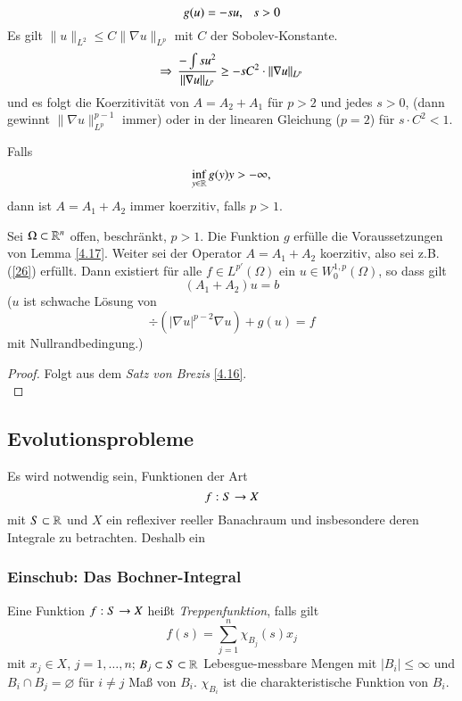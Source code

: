 \begin{beispiel}
\[
    g(u)=-su, \hspace{.25cm} s>0
\]
Es gilt $\|u\|_{L^2}\leq C\| \nabla u\|_{L^p}$ mit $C$ der Sobolev-Konstante.
\[
    \Rightarrow \, \frac{-\int su^2}{\|\nabla u\|_{L^p}} \geq -s C^2 \cdot\|\nabla u\|_{L^p}
\]
und es folgt die Koerzitivität von $A=A_2+A_1$ für $p>2$ und jedes $s>0$, (dann gewinnt $\|\nabla u \|
_{L^p}^{p-1}$ immer) oder in der linearen Gleichung ($p=2$) für $s\cdot C^2<1$.
\end{beispiel}

\begin{beispiel}
Falls
\begin{align}\label{26}
    \inf_{y\in \mathbb{R}} g(y) y> -\infty,
\end{align}
dann ist $A=A_1+A_2$ immer koerzitiv, falls $p>1$.
\end{beispiel}

\begin{theorem}\label{4.18}
    Sei $\Omega \subset\mathbb{R}^n$ offen, beschränkt, $p>1$. Die Funktion $g$ erfülle die Voraussetzungen von
    Lemma \ref{4.17}. Weiter sei der Operator $A=A_1+A_2$ koerzitiv, also sei z.B. (\ref{26}) erfüllt.
    Dann existiert für alle $f\in L^{p'}(\Omega)$ ein $u\in W_0^{1,p}(\Omega)$, so dass gilt
    \[
        (A_1+A_2)u=b
    \]
    ($u$ ist schwache Lösung von 
     \[
        \div(|\nabla u|^{p-2}\nabla u)+ g(u)=f
     \]
     mit Nullrandbedingung.)
\end{theorem}

\begin{proof}
    Folgt aus dem \textit{Satz von Brezis} \ref{4.16}. \[ \]
\end{proof}

\subsection{Evolutionsprobleme}

Es wird notwendig sein, Funktionen der Art
\[
    f:S\rightarrow X
\]
mit $S\subset \mathbb{R}$ und $X$ ein reflexiver reeller Banachraum und insbesondere deren Integrale zu
betrachten. Deshalb ein 

\subsubsection*{Einschub: Das Bochner-Integral}

\begin{defi}[Treppenfunktion]\label{4.19}
    Eine Funktion $f:S\rightarrow X$ heißt \textit{Treppenfunktion}, falls gilt
    \[
        f(s)=\sum_{j=1}^n \chi_{B_j} (s) x_j
    \]
    mit $x_j\in X$, $j=1,…,n$; $B_j\subset S \subset \mathbb{R}$ Lebesgue-messbare Mengen mit
    $|B_i|\leq \infty$ und $B_i\cap B_j=\varnothing$ für $i\neq j$ Maß von $B_i$. $\chi_{B_i}$ ist
    die charakteristische Funktion von $B_i$.    
\end{defi}

